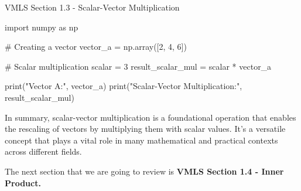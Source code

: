 \begin{notes}{VMLS Section 1.3 - Scalar-Vector Multiplication}
\begin{highlight}
    \begin{code}[Python]
    import numpy as np

    # Creating a vector
    vector_a = np.array([2, 4, 6])
    
    # Scalar multiplication
    scalar = 3
    result_scalar_mul = scalar * vector_a
    
    print("Vector A:", vector_a)
    print("Scalar-Vector Multiplication:", result_scalar_mul)
    \end{code}
    \end{highlight}

    In summary, scalar-vector multiplication is a foundational operation that enables the rescaling of vectors by multiplying them with scalar values. It's a versatile concept that plays a vital role in many mathematical 
    and practical contexts across different fields.
\end{notes}

The next section that we are going to review is \textbf{VMLS Section 1.4 - Inner Product.}

